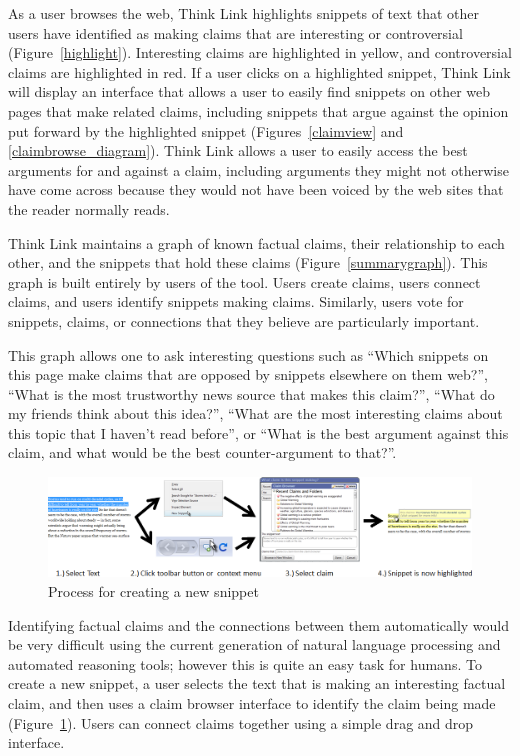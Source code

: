 \documentclass{chi2009}
\begin{document}
As a user browses the web, Think Link highlights snippets of text that other users have identified as making claims that are interesting or controversial (Figure~\ref{highlight}). Interesting claims are highlighted in yellow, and controversial claims are highlighted in red. If a user clicks on a highlighted snippet, Think Link will display an interface that allows a user to easily find snippets on other web pages that make related claims, including snippets that argue against the opinion put forward by the highlighted snippet (Figures~\ref{claimview} and \ref{claimbrowse_diagram}). Think Link allows a user to easily access the best arguments for and against a claim, including arguments they might not otherwise have come across because they would not have been voiced by the web sites that the reader normally reads.

Think Link maintains a graph of known factual claims, their relationship to each other, and the snippets that hold these claims (Figure~\ref{summarygraph}). This graph is built entirely by users of the tool. Users create claims, users connect claims, and users identify snippets making claims. Similarly, users vote for snippets, claims, or connections that they believe are particularly important.

This graph allows one to ask interesting questions such as ``Which snippets on this page make claims that are opposed by snippets elsewhere on them web?'', ``What is the most trustworthy news source that makes this claim?'', ``What do my friends think about this idea?'', ``What are the most interesting claims about this topic that I haven't read before'', or ``What is the best argument against this claim, and what would be the best counter-argument to that?''.

\begin{figure}[tb]
	\begin{center}
	\includegraphics[width=14cm]{../screenshots/newsnip_all.png}
	\caption{Process for creating a new snippet}
	\label{createprocess}
	\end{center}
\end{figure}

Identifying factual claims and the connections between them automatically would be very difficult using the current generation of natural language processing and automated reasoning tools; however this is quite an easy task for humans.  To create a new snippet, a user selects the text that is making an interesting factual claim, and then uses a claim browser interface to identify the claim being made (Figure~\ref{createprocess}). Users can connect claims together using a simple drag and drop interface.
\end{document}
